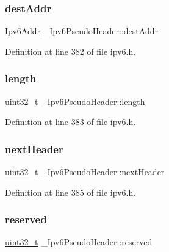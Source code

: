 \subsubsection{\texorpdfstring{dest\+Addr}{destAddr}}
{\footnotesize\ttfamily \hyperlink{ipv6_8h_aed0cbc40c61ed5b4fb681ebc55237e89}{Ipv6\+Addr} \+\_\+\+Ipv6\+Pseudo\+Header\+::dest\+Addr}



Definition at line 382 of file ipv6.\+h.

\mbox{\label{struct__Ipv6PseudoHeader_a2f404792878a64884e2a08d4b9e27ce3}} 
\subsubsection{\texorpdfstring{length}{length}}
{\footnotesize\ttfamily \hyperlink{stdint_8h_a435d1572bf3f880d55459d9805097f62}{uint32\+\_\+t} \+\_\+\+Ipv6\+Pseudo\+Header\+::length}



Definition at line 383 of file ipv6.\+h.

\mbox{\label{struct__Ipv6PseudoHeader_a44bb4765866ba058758dfc488757befb}} 
\subsubsection{\texorpdfstring{next\+Header}{nextHeader}}
{\footnotesize\ttfamily \hyperlink{stdint_8h_a435d1572bf3f880d55459d9805097f62}{uint32\+\_\+t} \+\_\+\+Ipv6\+Pseudo\+Header\+::next\+Header}



Definition at line 385 of file ipv6.\+h.

\mbox{\label{struct__Ipv6PseudoHeader_a30e349929eb737700fbec226ceb813c4}} 
\subsubsection{\texorpdfstring{reserved}{reserved}}
{\footnotesize\ttfamily \hyperlink{stdint_8h_a435d1572bf3f880d55459d9805097f62}{uint32\+\_\+t} \+\_\+\+Ipv6\+Pseudo\+Header\+::reserved}



